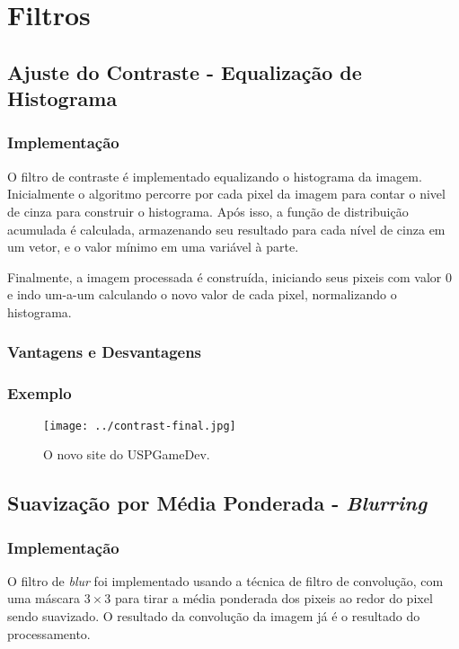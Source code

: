 




\cabecalho

\section{Filtros}

\subsection{Ajuste do Contraste - Equalização de Histograma}
\subsubsection{Implementação}
O filtro de contraste é implementado equalizando o histograma da imagem. Inicialmente o algoritmo percorre por cada pixel
da imagem para contar o nivel de cinza para construir o histograma. Após isso, a função de distribuição acumulada é 
calculada, armazenando seu resultado para cada nível de cinza em um vetor, e o valor mínimo em uma variável à parte.

Finalmente, a imagem processada é construída, iniciando seus pixeis com valor 0 e indo um-a-um calculando o novo valor
de cada pixel, normalizando o histograma.

\subsubsection{Vantagens e Desvantagens}
\subsubsection{Exemplo}
\begin{figure}[htb]
    \centering
    \texttt{[image: ../contrast-final.jpg]}
    \caption{O novo site do USPGameDev.}
    \label{fig:site_01}
\end{figure}

\subsection{Suavização por Média Ponderada - \textit{Blurring}}
\subsubsection{Implementação}
O filtro de \textit{blur} foi implementado usando a técnica de filtro de convolução, com uma máscara $3\times 3$ para tirar
a média ponderada dos pixeis ao redor do pixel sendo suavizado. O resultado da convolução da imagem já é o resultado
do processamento.

